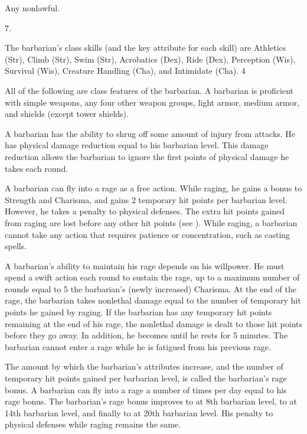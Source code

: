  Any nonlawful.

 7.

The barbarian's class skills (and the key attribute for each skill) are
Athletics (Str), Climb (Str), Swim (Str), Acrobatics (Dex), Ride (Dex), Perception (Wis), Survival (Wis), Creature Handling (Cha), and Intimidate (Cha).
 4


All of the following are class features of the barbarian.
  A barbarian is proficient with simple weapons, any four other weapon groups, light armor, medium armor, and shields (except tower shields).

 A barbarian has the ability to shrug off some amount of injury from attacks. He has physical damage reduction equal to his barbarian level. This damage reduction allows the barbarian to ignore the first points of physical damage he takes each round.

 A barbarian can fly into a rage as a free action. While raging, he gains a  bonus to Strength and Charisma, and gains 2 temporary hit points per barbarian level. However, he takes a  penalty to physical defenses. The extra hit points gained from raging are lost before any other hit points (see ). While raging, a barbarian cannot take any action that requires patience or concentration, such as casting spells.

A barbarian's ability to maintain his rage depends on his willpower. He must spend a swift action each round to sustain the rage, up to a maximum number of rounds equal to 5 \add the barbarian's (newly increased) Charisma. At the end of the rage, the barbarian takes nonlethal damage equal to the number of temporary hit points he gained by raging. If the barbarian has any temporary hit points remaining at the end of his rage, the nonlethal damage is dealt to those hit points before they go away. In addition, he becomes \fatigued until he rests for 5 minutes. The barbarian cannot enter a rage while he is fatigued from his previous rage.

The amount by which the barbarian's attributes increase, and the number of temporary hit points gained per barbarian level, is called the barbarian's rage bonus. A barbarian can fly into a rage a number of times per day equal to his rage bonus. The barbarian's rage bonus improves to  at 8th barbarian level, to  at 14th barbarian level, and finally to  at 20th barbarian level. His penalty to physical defenses while raging remains the same.

